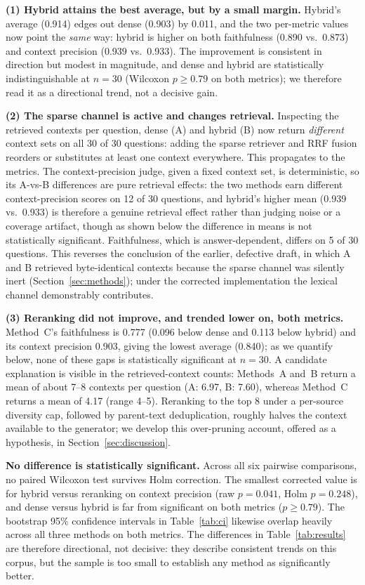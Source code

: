 \documentclass[conference]{IEEEtran}
\begin{document}
\textbf{(1) Hybrid attains the best average, but by a small margin.}
Hybrid's average (0.914) edges out dense (0.903) by 0.011, and the two
per-metric values now point the \emph{same} way: hybrid is higher on both
faithfulness (0.890 vs.\ 0.873) and context precision (0.939 vs.\ 0.933). The
improvement is consistent in direction but modest in magnitude, and dense and
hybrid are statistically indistinguishable at $n=30$ (Wilcoxon $p\geq0.79$ on
both metrics); we therefore read it as a directional trend, not a decisive gain.

\textbf{(2) The sparse channel is active and changes retrieval.} Inspecting the
retrieved contexts per question, dense (A) and hybrid (B) now return
\emph{different} context sets on all 30 of 30 questions: adding the sparse
retriever and RRF fusion reorders or substitutes at least one context everywhere.
This propagates to the metrics. The context-precision judge, given a fixed context
set, is deterministic, so its A-vs-B differences are pure retrieval effects: the
two methods earn different context-precision scores on 12 of 30 questions, and
hybrid's higher mean (0.939 vs.\ 0.933) is therefore a genuine retrieval effect
rather than judging noise or a coverage artifact, though as shown below the
difference in means is not statistically significant. Faithfulness, which is
answer-dependent, differs on 5 of 30 questions. This reverses the conclusion of
the earlier, defective draft, in which A and B retrieved byte-identical contexts
because the sparse channel was silently inert (Section~\ref{sec:methods}); under
the corrected implementation the lexical channel demonstrably contributes.

\textbf{(3) Reranking did not improve, and trended lower on, both metrics.}
Method~C's faithfulness is 0.777 (0.096 below dense and 0.113 below hybrid) and
its context precision 0.903, giving the lowest average (0.840); as we quantify
below, none of these gaps is statistically significant at $n=30$. A candidate
explanation is visible in the retrieved-context counts: Methods~A and~B return a
mean of about 7--8 contexts per question (A: 6.97, B: 7.60), whereas Method~C
returns a mean of 4.17 (range 4--5). Reranking to the top 8 under a per-source
diversity cap, followed by parent-text deduplication, roughly halves the context
available to the generator; we develop this over-pruning account, offered as a
hypothesis, in Section~\ref{sec:discussion}.

\textbf{No difference is statistically significant.} Across all six pairwise
comparisons, no paired Wilcoxon test survives Holm correction. The smallest
corrected value is for hybrid versus reranking on context precision (raw
$p=0.041$, Holm $p=0.248$), and dense versus hybrid is far from significant on
both metrics ($p\geq0.79$). The bootstrap 95\% confidence intervals in
Table~\ref{tab:ci} likewise overlap heavily across all three methods on both
metrics. The differences in Table~\ref{tab:results} are therefore directional,
not decisive: they describe consistent trends on this corpus, but the sample is
too small to establish any method as significantly better.
\end{document}
